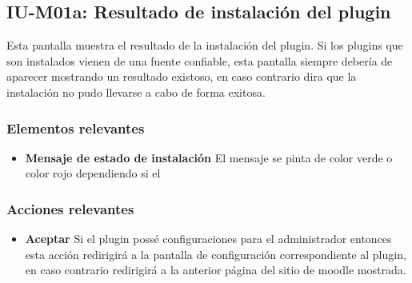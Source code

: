
\subsection{IU-M01a: Resultado de instalación del plugin}

 Esta pantalla muestra el resultado de la instalación del plugin. Si los plugins
 que son instalados vienen de una fuente confiable, esta pantalla siempre debería
 de aparecer mostrando un resultado existoso, en caso contrario dira que la instalación
 no pudo llevarse a cabo de forma exitosa.


\subsubsection{Elementos relevantes}

    \begin{itemize}
    \item {\bf Mensaje de estado de instalación}
        El mensaje se pinta de color verde o color rojo dependiendo si el 
    \end{itemize}

\subsubsection{Acciones relevantes}

    \begin{itemize}
    \item {\bf Aceptar}
        Si el plugin possé configuraciones para el administrador entonces esta acción
        redirigirá a la pantalla de configuración correspondiente al plugin, en caso
        contrario redirigirá a la anterior página del sitio de moodle mostrada.
    \end{itemize}
